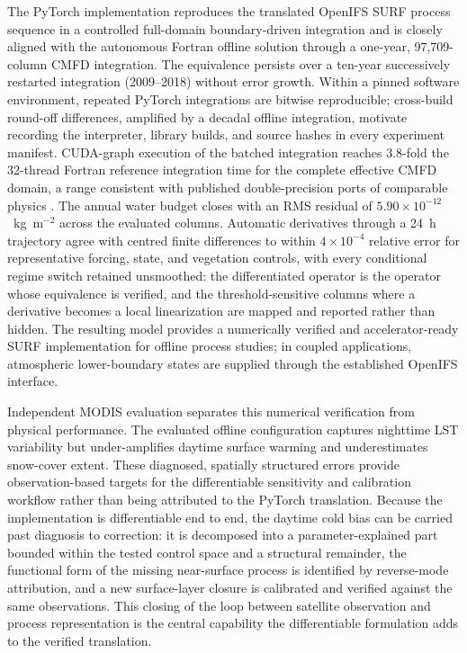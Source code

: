 \documentclass[gmd, manuscript]{copernicus}
\begin{document}
The PyTorch implementation reproduces the translated OpenIFS SURF process
sequence in a controlled full-domain boundary-driven integration and is closely aligned with
the autonomous Fortran offline solution through a one-year, 97,709-column
CMFD integration. The equivalence persists over a ten-year successively restarted
integration (2009--2018) without error growth.
Within a pinned software environment, repeated PyTorch integrations are
bitwise reproducible; cross-build round-off differences, amplified by a
decadal offline integration, motivate recording the interpreter, library
builds, and source hashes in every experiment manifest. CUDA-graph execution of the
batched integration reaches 3.8-fold
the 32-thread Fortran reference integration time for the complete
effective CMFD domain, a range consistent with published double-precision
ports of comparable physics \citep{Dahm2023Pace,Lahlou2026CLMml,Lapillonne2026ICON}.
The annual water budget closes with an RMS residual of
$5.90\times10^{-12}$~kg~m$^{-2}$ across the evaluated columns. Automatic
derivatives through a 24~h trajectory agree
with centred finite differences to within $4\times10^{-4}$ relative error for
representative forcing, state, and vegetation controls, with every
conditional regime switch retained unsmoothed: the differentiated operator
is the operator whose equivalence is verified, and the threshold-sensitive
columns where a derivative becomes a local linearization are mapped and
reported rather than hidden. The resulting model
provides a numerically verified and accelerator-ready SURF implementation for
offline process studies; in coupled applications, atmospheric lower-boundary
states are supplied through the established OpenIFS interface.

Independent MODIS evaluation separates this numerical verification from
physical performance. The evaluated offline configuration captures nighttime
LST variability but under-amplifies daytime surface warming and underestimates
snow-cover extent. These diagnosed, spatially structured errors provide
observation-based targets for the differentiable sensitivity and calibration
workflow rather than being attributed to the PyTorch translation. Because the
implementation is differentiable end to end, the daytime cold bias can be
carried past diagnosis to correction: it is decomposed into a
parameter-explained part bounded within the tested control space and a
structural remainder, the functional form of the missing near-surface
process is identified by reverse-mode attribution, and a new surface-layer
closure is calibrated and verified against the same observations. This
closing of the loop between satellite observation and process representation
is the central capability the differentiable formulation adds to the verified
translation.
\end{document}
